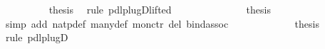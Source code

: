 \begin{isabellebody}
\isanewline
\ \ \ \ \ \ \ \ \isamarkupfalse%
\ {\isacharquery}thesis\ \isamarkupfalse%
\ {\isacharparenleft}rule\ pdl{\isacharunderscore}plugD{\isacharunderscore}lifted{}{\isacharparenright}\isanewline
\ \ \ \ \ \ \isamarkupfalse%
\isanewline
\ \ \ \ \ \ \isamarkupfalse%
\ {\isacharquery}thesis\ \isamarkupfalse%
\ {\isacharparenleft}simp\ add{\isacharcolon}\ natp{\isacharunderscore}def\ many{}{\isacharunderscore}def\ mon{\isacharunderscore}ctr\ del{\isacharcolon}\ bind{\isacharunderscore}assoc{\isacharparenright}\isanewline
\ \ \ \ \isamarkupfalse%
\isanewline
\ \ \isamarkupfalse%
\isanewline
\ \ \isamarkupfalse%
\ \isamarkupfalse%
\ {\isacharquery}thesis\ \isamarkupfalse%
\ {\isacharparenleft}rule\ pdl{\isacharunderscore}plugD{\isacharparenright}\isanewline
\isamarkupfalse%
\isanewline
\isamarkupfalse%
\isamarkupfalse%
\isamarkuptrue%
\isamarkupfalse%
\isamarkupfalse%
\isamarkupfalse%
\isamarkupfalse%
\isamarkupfalse%
\isamarkupfalse%
\isamarkupfalse%
\isamarkupfalse%
\isamarkupfalse%
\isamarkupfalse%
\isamarkupfalse%
\isamarkupfalse%
\isamarkupfalse%
\isamarkupfalse%
\isamarkupfalse%
\isamarkupfalse%
\isamarkuptrue%
\isamarkupfalse%
\isamarkupfalse%
\isamarkupfalse%
\isamarkupfalse%
\isamarkupfalse%
\isamarkupfalse%
\isamarkupfalse%
\isamarkupfalse%
\isanewline
\isamarkupfalse%
\end{isabellebody}%
